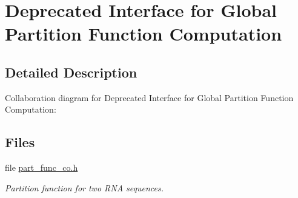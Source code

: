 \hypertarget{group__part__func__global__deprecated}{}\section{Deprecated Interface for Global Partition Function Computation}
\label{group__part__func__global__deprecated}


\subsection{Detailed Description}
Collaboration diagram for Deprecated Interface for Global Partition Function Computation\+:
\subsection*{Files}
\begin{DoxyCompactItemize}
\item 
file \mbox{\hyperlink{part__func__co_8h}{part\+\_\+func\+\_\+co.\+h}}
\begin{DoxyCompactList}\small\item\em Partition function for two R\+NA sequences. \end{DoxyCompactList}\end{DoxyCompactItemize}
